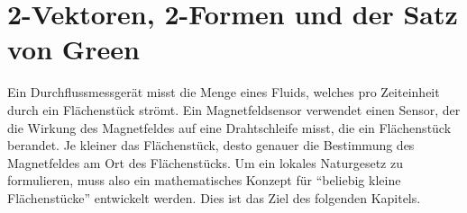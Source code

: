 %
%
%
\chapter{2-Vektoren, 2-Formen und der Satz von Green
\label{chapter:green}}

\noindent
Ein Durchflussmessgerät misst die Menge eines Fluids, welches pro
Zeiteinheit durch ein Flächenstück strömt.
Ein Magnetfeldsensor verwendet einen Sensor, der die Wirkung des Magnetfeldes
auf eine Drahtschleife misst, die ein Flächenstück berandet.
Je kleiner das Flächenstück, desto genauer die Bestimmung des Magnetfeldes
am Ort des Flächenstücks.
Um ein lokales Naturgesetz zu formulieren, muss also ein mathematisches
Konzept für ``beliebig kleine Flächenstücke'' entwickelt werden.
Dies ist das Ziel des folgenden Kapitels.







\uebungsabschnitt

\begin{uebungsaufgaben}
\end{uebungsaufgaben}
\enduebungsabschnitt


